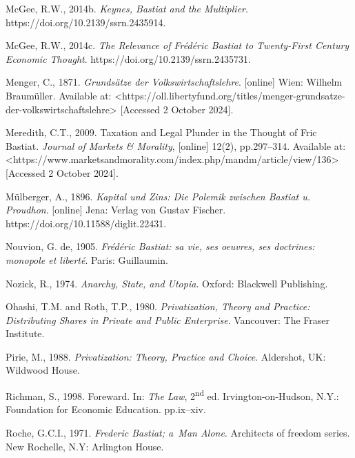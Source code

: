 McGee, R.W., 2014b. \textit{Keynes, Bastiat and the Multiplier}. https://doi.org/10.2139/ssrn.2435914.



McGee, R.W., 2014c. \textit{The Relevance of Frédéric Bastiat to Twenty-First Century Economic Thought}. https://doi.org/10.2139/ssrn.2435731.



Menger, C., 1871. \textit{Grundsätze der Volkswirtschaftslehre}. [online] Wien: Wilhelm Braumüller. Available at: {\textless}https://oll.libertyfund.org/titles/menger-grundsatze-der-volkswirtschaftslehre{\textgreater} [Accessed 2 October 2024].



Meredith, C.T., 2009. Taxation and Legal Plunder in the Thought of Fric Bastiat. \textit{Journal of Markets \& Morality}, [online] 12(2), pp.297–314. Available at: {\textless}https://www.marketsandmorality.com/index.php/mandm/article/view/136{\textgreater} [Accessed 2 October 2024].



Mülberger, A., 1896. \textit{Kapital und Zins: Die Polemik zwischen Bastiat u. Proudhon}. [online] Jena: Verlag von Gustav Fischer. https://doi.org/10.11588/diglit.22431.



Nouvion, G. de, 1905. \textit{Frédéric Bastiat: sa vie, ses oeuvres, ses doctrines: monopole et liberté}. Paris: Guillaumin.



Nozick, R., 1974. \textit{Anarchy, State, and Utopia}. Oxford: Blackwell Publishing.



Ohashi, T.M. and Roth, T.P., 1980. \textit{Privatization, Theory and Practice: Distributing Shares in Private and Public Enterprise}. Vancouver: The Fraser Institute.



Pirie, M., 1988. \textit{Privatization: Theory, Practice and Choice}. Aldershot, UK: Wildwood House.



Richman, S., 1998. Foreward. In: \textit{The Law}, 2\textsuperscript{nd} ed. Irvington-on-Hudson, N.Y.: Foundation for Economic Education. pp.ix–xiv.



Roche, G.C.I., 1971. \textit{Frederic Bastiat; a~Man Alone}. Architects of freedom series. New Rochelle, N.Y: Arlington House.




